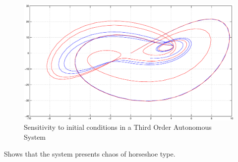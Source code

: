 \begin{itemize}
\begin{itemize}
            \begin{figure}[h]
            \centering
            \includegraphics[scale=0.4]{imagenes/2-benford/in_cond.eps}
            \caption{Sensitivity to initial conditions in a Third Order Autonomous System}
            \end{figure}

     \end{itemize}
\end{itemize}

\cite{Takougang13} Shows that the system presents chaos of horseshoe type.
